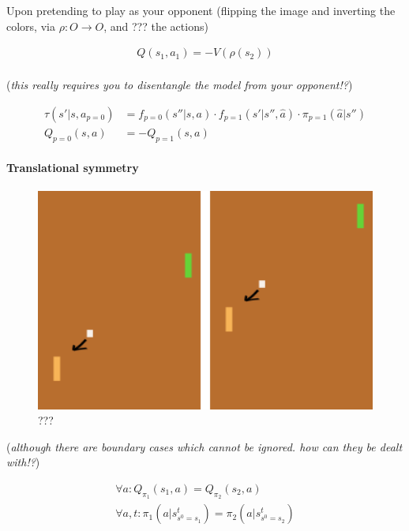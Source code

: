 Upon pretending to play as your opponent (flipping the image and
inverting the colors, via \(\rho: O \to O\), and ??? the actions)

\begin{align}
Q(s_1, a_1) = - V(\rho(s_2)) \\
\end{align}

(\emph{this really requires you to disentangle the model from your
opponent!?})

\begin{align}
\tau(s'|s, a_{p=0}) &= f_{p=0}(s''|s, a) \cdot f_{p=1}(s'|s'', \hat a) \cdot \pi_{p=1}(\hat a|s'') \\
Q_{p=0}(s, a) &= -Q_{p=1}(s, a)
\end{align}

\hypertarget{translational-symmetry-1}{%
\paragraph{Translational symmetry}\label{translational-symmetry-1}}

\begin{figure}
\centering
\includegraphics[width=1\textwidth,height=0.25\textheight]{../../pictures/drawings/pong-trans.png}
\caption{???}
\end{figure}

(\emph{although there are boundary cases which cannot be ignored. how
can they be dealt with!?})

\begin{align}
\forall a: Q_{\pi_1}(s_1, a) = Q_{\pi_2}(s_2, a) \\
\forall a, t: \pi_1(a|s^t_{s^0=s_1}) = \pi_2(a|s^t_{s^0=s_2})
\end{align}


